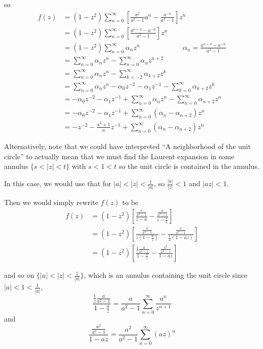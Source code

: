 \documentclass[12pt]{Homework}
\begin{document}
\begin{solution}
so \begin{align*}
    f(z)&=(1-z^2)\sum_{n=0}^\infty\left[\frac{a^2}{a^2-1}a^n-\frac{a^{-n}}{a^2-1}\right]z^n\\
    &=(1-z^2)\sum_{n=0}^\infty\left[\frac{a^{n+2}-a^{-n}}{a^2-1}\right]z^n\\
    &=(1-z^2)\sum_{n=0}^\infty \alpha_nz^n\qquad\qquad\qquad \alpha_n=\frac{a^{n+2}-a^{-n}}{a^2-1}\\
    &=\sum_{n=0}^\infty \alpha_nz^n-\sum_{n=0}^\infty \alpha_nz^{n+2}\\
    &=\sum_{n=0}^\infty \alpha_nz^n-\sum_{k=-2}^\infty \alpha_{k+2}z^k\\
    &=\sum_{n=0}^\infty \alpha_nz^n-\alpha_0z^{-2}-\alpha_1z^{-1}-\sum_{k=0}^\infty \alpha_{k+2}z^k\\
    &=-\alpha_0z^{-2}-\alpha_1z^{-1}+\sum_{n=0}^\infty \alpha_nz^n-\sum_{n=0}^\infty \alpha_{n+2}z^n\\
    &=-\alpha_0z^{-2}-\alpha_1z^{-1}+\sum_{n=0}^\infty(\alpha_n-\alpha_{n+2})z^n\\
    &=-z^{-2}-\frac{a^2+1}{a}z^{-1}+\sum_{n=0}^\infty(\alpha_n-\alpha_{n+2})z^n
\end{align*}

Alternatively, note that we could have interpreted ``A neighborhood of the unit circle'' to actually mean that we must find the Laurent expansion in some annulus $\{s<|z|<t\}$ with $s<1<t$ so the unit circle is contained in the annulus.

In this case, we would use that for $|a|<|z|<\frac{1}{|a|}$, so $\frac{|a|}{|z|}<1$ and $|az|<1$. 

Then we would simply rewrite $f(z)$ to be \begin{align*}
    f(z)&=(1-z^2)\left[\frac{\frac{a}{a^2-1}}{z-a}-\frac{\frac{a}{a^2-1}}{z-\frac{1}{a}}\right]\\
    &=(1-z^2)\left[\frac{\frac{a}{a^2-1}}{z(1-\frac{a}{z})}-\frac{\frac{a}{a^2-1}}{\frac{1}{a}(1-az)}\right]\\
    &=(1-z^2)\left[\frac{\frac{1}{z}\frac{a}{a^2-1}}{1-\frac{a}{z}}-\frac{\frac{a^2}{a^2-1}}{1-az}\right]
\end{align*}

and so on $\{|a|<|z|<\frac{1}{|a|}\}$, which is an annulus containing the unit circle since $|a|<1<\frac{1}{|a|}$, $$\frac{\frac{1}{z}\frac{a}{a^2-1}}{1-\frac{a}{z}}=\frac{a}{a^2-1}\sum_{n=0}^\infty\frac{a^n}{z^{n+1}}$$ and $$\frac{\frac{a^2}{a^2-1}}{1-az}=\frac{a^2}{a^2-1}\sum_{n=0}^\infty(az)^n$$


\end{solution}
\end{document}
